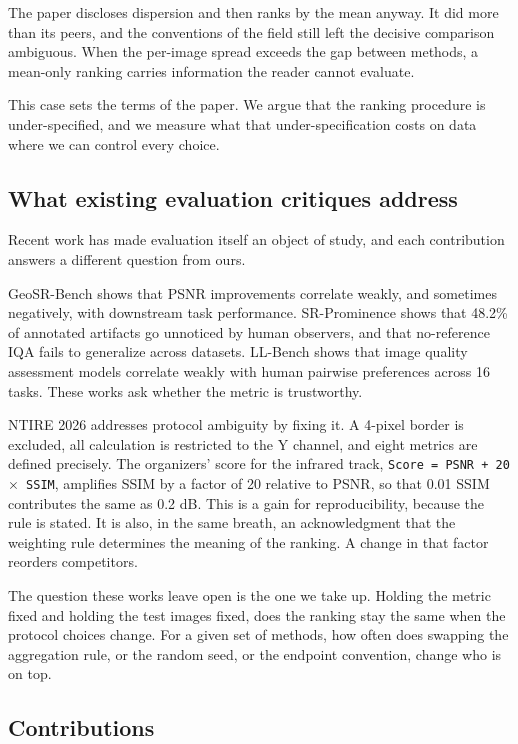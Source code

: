 \documentclass{interact}
\begin{document}
The paper discloses dispersion and then ranks by the mean anyway. It did more than its peers, and the conventions of the field still left the decisive comparison ambiguous. When the per-image spread exceeds the gap between methods, a mean-only ranking carries information the reader cannot evaluate.

This case sets the terms of the paper. We argue that the ranking procedure is under-specified, and we measure what that under-specification costs on data where we can control every choice.

\subsection{What existing evaluation critiques address}\label{sec:prior}

Recent work has made evaluation itself an object of study, and each contribution answers a different question from ours.

GeoSR-Bench shows that PSNR improvements correlate weakly, and sometimes negatively, with downstream task performance. SR-Prominence shows that 48.2\% of annotated artifacts go unnoticed by human observers, and that no-reference IQA fails to generalize across datasets. LL-Bench shows that image quality assessment models correlate weakly with human pairwise preferences across 16 tasks. These works ask whether the metric is trustworthy.

NTIRE 2026 addresses protocol ambiguity by fixing it. A 4-pixel border is excluded, all calculation is restricted to the Y channel, and eight metrics are defined precisely. The organizers' score for the infrared track, \texttt{Score = PSNR + 20 $\times$ SSIM}, amplifies SSIM by a factor of 20 relative to PSNR, so that 0.01 SSIM contributes the same as 0.2 dB. This is a gain for reproducibility, because the rule is stated. It is also, in the same breath, an acknowledgment that the weighting rule determines the meaning of the ranking. A change in that factor reorders competitors.

The question these works leave open is the one we take up. Holding the metric fixed and holding the test images fixed, does the ranking stay the same when the protocol choices change. For a given set of methods, how often does swapping the aggregation rule, or the random seed, or the endpoint convention, change who is on top.

\subsection{Contributions}\label{sec:contributions}
\end{document}
